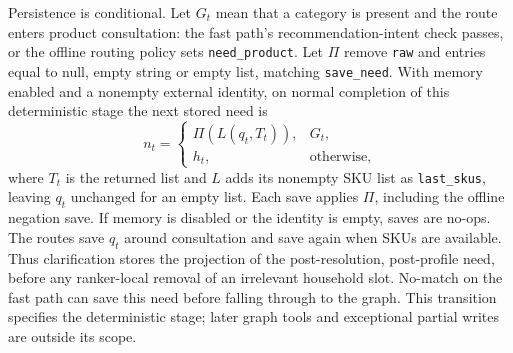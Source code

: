 \documentclass[conference,a4paper]{IEEEtran}
\newcommand{\code}[1]{\texttt{#1}}
\begin{document}
Persistence is conditional. Let $G_t$ mean that a category is present and the route enters product consultation: the fast path's recommendation-intent check passes, or the offline routing policy sets \code{need\_product}. Let $\Pi$ remove \code{raw} and entries equal to null, empty string or empty list, matching \code{save\_need}. With memory enabled and a nonempty external identity, on normal completion of this deterministic stage the next stored need is
\[
n_t=\begin{cases}
\Pi(L(q_t,T_t)),&G_t,\\
h_t,&\text{otherwise},
\end{cases}
\]
where $T_t$ is the returned list and $L$ adds its nonempty SKU list as \code{last\_skus}, leaving $q_t$ unchanged for an empty list. Each save applies $\Pi$, including the offline negation save. If memory is disabled or the identity is empty, saves are no-ops. The routes save $q_t$ around consultation and save again when SKUs are available. Thus clarification stores the projection of the post-resolution, post-profile need, before any ranker-local removal of an irrelevant household slot. No-match on the fast path can save this need before falling through to the graph. This transition specifies the deterministic stage; later graph tools and exceptional partial writes are outside its scope.
\end{document}
